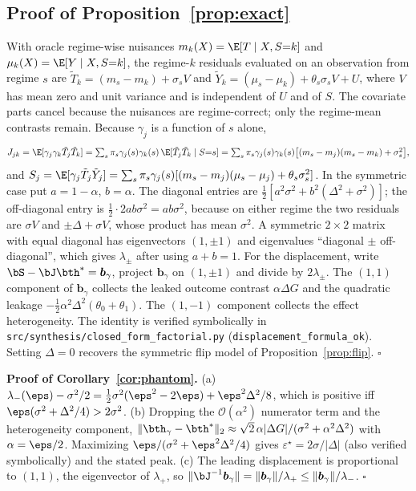 \subsection{Proof of Proposition~\ref{prop:exact}}
With oracle regime-wise nuisances $m_k(X)=\E[T\mid X,S{=}k]$ and $\mu_k(X)=\E[Y\mid X,S{=}k]$, the regime-$k$ residuals evaluated on an observation from regime $s$ are $\tilde T_k=(m_s-m_k)+\sigma_sV$ and $\tilde Y_k=(\mu_s-\mu_k)+\theta_s\sigma_sV+U$, where $V$ has mean zero and unit variance and is independent of $U$ and of $S$. The covariate parts cancel because the nuisances are regime-correct; only the regime-mean contrasts remain. Because $\gamma_j$ is a function of $s$ alone,
\[
J_{jk}=\E[\gamma_j\gamma_k\tilde T_j\tilde T_k]=\textstyle\sum_s\pi_s\gamma_j(s)\gamma_k(s)\,\E[\tilde T_j\tilde T_k\mid S{=}s]
=\textstyle\sum_s\pi_s\gamma_j(s)\gamma_k(s)\big[(m_s-m_j)(m_s-m_k)+\sigma_s^2\big],
\]
and $S_j=\E[\gamma_j\tilde T_j\tilde Y_j]=\sum_s\pi_s\gamma_j(s)[(m_s-m_j)(\mu_s-\mu_j)+\theta_s\sigma_s^2]$.
In the symmetric case put $a=1-\alpha$, $b=\alpha$. The diagonal entries are $\tfrac12[a^2\sigma^2+b^2(\Delta^2+\sigma^2)]$; the off-diagonal entry is $\tfrac12\cdot2ab\sigma^2=ab\sigma^2$, because on either regime the two residuals are $\sigma V$ and $\pm\Delta+\sigma V$, whose product has mean $\sigma^2$. A symmetric $2\times2$ matrix with equal diagonal has eigenvectors $(1,\pm1)$ and eigenvalues ``diagonal $\pm$ off-diagonal'', which gives $\lambda_\pm$ after using $a+b=1$. For the displacement, write $\bS-\bJ\bth^*=\boldsymbol b_\gamma$, project $\boldsymbol b_\gamma$ on $(1,\pm1)$ and divide by $2\lambda_\pm$. The $(1,1)$ component of $\boldsymbol b_\gamma$ collects the leaked outcome contrast $\alpha\Delta G$ and the quadratic leakage $-\tfrac12\alpha^2\Delta^2(\theta_0+\theta_1)$. The $(1,-1)$ component collects the effect heterogeneity. The identity is verified symbolically in \texttt{src/synthesis/closed\_form\_factorial.py} (\texttt{displacement\_formula\_ok}). Setting $\Delta=0$ recovers the symmetric flip model of Proposition~\ref{prop:flip}. $\square$

\textbf{Proof of Corollary~\ref{cor:phantom}.} (a) $\lambda_-(\eps)-\sigma^2/2=\tfrac12\sigma^2(\eps^2-2\eps)+\eps^2\Delta^2/8$, which is positive iff $\eps(\sigma^2+\Delta^2/4)>2\sigma^2$. (b) Dropping the $\mathcal O(\alpha^2)$ numerator term and the heterogeneity component, $\|\bth_\gamma-\bth^*\|_2\approx\sqrt2\,\alpha|\Delta G|/(\sigma^2+\alpha^2\Delta^2)$ with $\alpha=\eps/2$. Maximizing $\eps/(\sigma^2+\eps^2\Delta^2/4)$ gives $\varepsilon^\star=2\sigma/|\Delta|$ (also verified symbolically) and the stated peak. (c) The leading displacement is proportional to $(1,1)$, the eigenvector of $\lambda_+$, so $\|\bJ^{-1}\boldsymbol b_\gamma\|=\|\boldsymbol b_\gamma\|/\lambda_+\le\|\boldsymbol b_\gamma\|/\lambda_-$. $\square$

